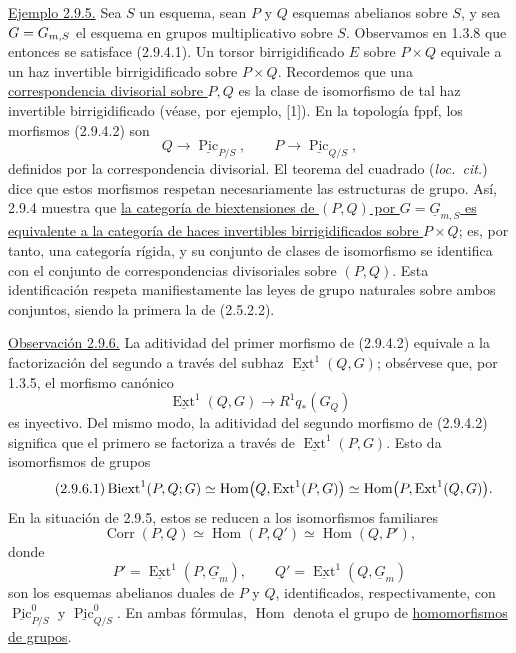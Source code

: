 \underline{Ejemplo 2.9.5.} Sea $S$ un esquema, sean $P$ y $Q$
esquemas abelianos sobre $S$, y sea
$G=\sisi{\underline G_{mS}}{\underline G_{m,S}}$ el esquema en grupos
multiplicativo sobre $S$. Observamos en 1.3.8 que entonces se satisface
(2.9.4.1). Un torsor birrigidificado $E$ sobre $P\times Q$ equivale a
un haz invertible birrigidificado sobre $P\times Q$. Recordemos que una
\underline{correspondencia divisorial sobre $P,Q$} es la clase de
isomorfismo de tal haz invertible birrigidificado (véase, por ejemplo,
[1]). En la topología fppf, los morfismos (2.9.4.2) son
\begin{equation}\tag{2.9.5.1}
 Q\longrightarrow\underline{\operatorname{Pic}}_{P/S},
 \qquad
 P\longrightarrow\underline{\operatorname{Pic}}_{Q/S},
\end{equation}
definidos por la correspondencia divisorial. El teorema del cuadrado
(\emph{loc.\ cit.}) dice que estos morfismos respetan necesariamente
las estructuras de grupo. Así, 2.9.4 muestra que
\underline{la categoría de biextensiones de $(P,Q)$ por
$G=\underline G_{m,S}$ es equivalente a la categoría de haces
invertibles birrigidificados sobre $P\times Q$}; es, por tanto, una
categoría rígida, y su conjunto de clases de isomorfismo se identifica
con el conjunto de correspondencias divisoriales sobre $(P,Q)$. Esta
identificación respeta manifiestamente las leyes de grupo naturales
sobre ambos conjuntos, siendo la primera la de (2.5.2.2).

\underline{Observación 2.9.6.} La aditividad del primer morfismo de
(2.9.4.2) equivale a la factorización del segundo a través del subhaz
$\underline{\operatorname{Ext}}^1(Q,G)$; obsérvese que, por 1.3.5, el
morfismo canónico
\[
 \underline{\operatorname{Ext}}^1(Q,G)
 \longrightarrow R^1q_*(G_Q)
\]
es inyectivo. Del mismo modo, la aditividad del segundo morfismo de
(2.9.4.2) significa que el primero se factoriza a través de
$\underline{\operatorname{Ext}}^1(P,G)$. Esto da isomorfismos de grupos
\begin{equation}\tag{2.9.6.1}
 \operatorname{Biext}\sisi{}{^{1}}(P,Q;G)
 \simeq
 \operatorname{Hom}\bigl(Q,\underline{\operatorname{Ext}}^1(P,G)\bigr)
 \simeq
 \operatorname{Hom}\bigl(P,\underline{\operatorname{Ext}}^1(Q,G)\bigr).
\end{equation}
En la situación de 2.9.5, estos se reducen a los isomorfismos
familiares
\begin{equation}\tag{2.9.6.2}
 \operatorname{Corr}(P,Q)
 \simeq \operatorname{Hom}(P,Q')
 \simeq \operatorname{Hom}(Q,P'),
\end{equation}
donde
\[
 P'=\underline{\operatorname{Ext}}^1(P,\underline G_m),
 \qquad
 Q'=\underline{\operatorname{Ext}}^1(Q,\underline G_m)
\]
son los esquemas abelianos duales de $P$ y $Q$, identificados,
respectivamente, con $\underline{\operatorname{Pic}}^0_{P/S}$ y
$\underline{\operatorname{Pic}}^0_{Q/S}$. En ambas fórmulas,
$\operatorname{Hom}$ denota el grupo de \underline{homomorfismos de
grupos}.
